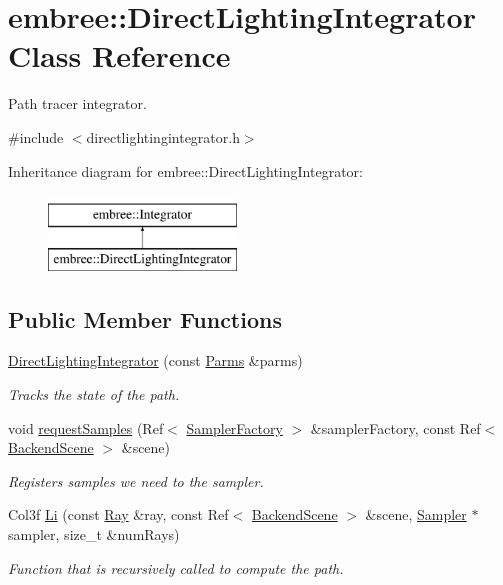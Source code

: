 \hypertarget{classembree_1_1_direct_lighting_integrator}{
\section{embree::DirectLightingIntegrator Class Reference}
\label{classembree_1_1_direct_lighting_integrator}
}


Path tracer integrator.  




{\ttfamily \#include $<$directlightingintegrator.h$>$}

Inheritance diagram for embree::DirectLightingIntegrator:\begin{figure}[H]
\begin{center}
\leavevmode
\includegraphics[height=2.000000cm]{classembree_1_1_direct_lighting_integrator}
\end{center}
\end{figure}
\subsection*{Public Member Functions}
\begin{DoxyCompactItemize}
\item 
\hyperlink{classembree_1_1_direct_lighting_integrator_a114a052d706bd3d7bc1620795a1848f4}{DirectLightingIntegrator} (const \hyperlink{classembree_1_1_parms}{Parms} \&parms)
\begin{DoxyCompactList}\small\item\em Tracks the state of the path. \item\end{DoxyCompactList}\item 
void \hyperlink{classembree_1_1_direct_lighting_integrator_a6043ec2711ed0aa764c3ff386223cbca}{requestSamples} (Ref$<$ \hyperlink{classembree_1_1_sampler_factory}{SamplerFactory} $>$ \&samplerFactory, const Ref$<$ \hyperlink{classembree_1_1_backend_scene}{BackendScene} $>$ \&scene)
\begin{DoxyCompactList}\small\item\em Registers samples we need to the sampler. \item\end{DoxyCompactList}\item 
Col3f \hyperlink{classembree_1_1_direct_lighting_integrator_a4dbebb16520d11bcd37cc271971a6d24}{Li} (const \hyperlink{structembree_1_1_ray}{Ray} \&ray, const Ref$<$ \hyperlink{classembree_1_1_backend_scene}{BackendScene} $>$ \&scene, \hyperlink{classembree_1_1_sampler}{Sampler} $\ast$sampler, size\_\-t \&numRays)
\begin{DoxyCompactList}\small\item\em Function that is recursively called to compute the path. \item\end{DoxyCompactList}\end{DoxyCompactItemize}


